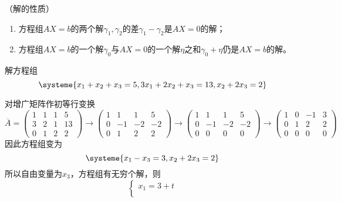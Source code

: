 \begin{theorem}
    （解的性质）
    \begin{enumerate}[(1)]
        \item 方程组$AX=b$的两个解$\gamma_1,\gamma_2$的差$\gamma_1 - \gamma_2$是$AX=0$的解；
        \item 方程组$AX=b$的一个解$\gamma_0$与$AX=0$的一个解$\eta$之和$\gamma_0+\eta$仍是$AX=b$的解。
    \end{enumerate}
\end{theorem}

\begin{example}
    解方程组
    \[
        \systeme{
            x_1 +  x_2 +  x_3 = 5,
            3x_1 + 2x_2 +  x_3 = 13,
            x_2 + 2x_3 =2
        }
    \]
\end{example}
\begin{solution}
    对增广矩阵作初等行变换
    \[
        \overline{A}
        =
        \left(\begin{array}{ccc|c}
                1 & 1 & 1 & 5  \\
                3 & 2 & 1 & 13 \\
                0 & 1 & 2 & 2
            \end{array}\right)
        \longrightarrow
        \left(\begin{array}{ccc|c}
                1 & 1  & 1  & 5  \\
                0 & -1 & -2 & -2 \\
                0 & 1  & 2  & 2
            \end{array}\right)
        \longrightarrow
        \left(\begin{array}{ccc|c}
                1 & 1  & 1  & 5  \\
                0 & -1 & -2 & -2 \\
                0 & 0  & 0  & 0
            \end{array}\right)
        \longrightarrow
        \left(\begin{array}{ccc|c}
                1 & 0 & -1 & 3 \\
                0 & 1 & 2  & 2 \\
                0 & 0 & 0  & 0
            \end{array}\right)
    \]
    因此方程组变为
    \[
        \systeme{
            x_1 - x_3 = 3,
            x_2 + 2x_3 = 2
        }
    \]
    所以自由变量为$x_3$，方程组有无穷个解，则
    \[
        \begin{cases}
            x_1 = 3+t  \\

\end{cases}\]
\end{solution}

